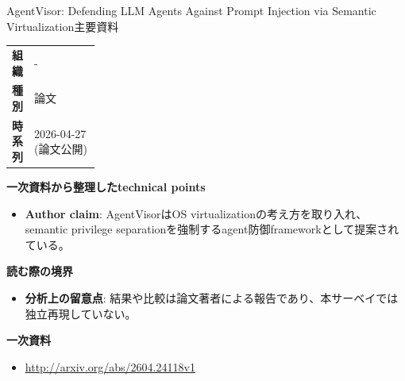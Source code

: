 \begin{technicalnote}{AgentVisor: Defending LLM Agents Against Prompt Injection via Semantic Virtualization}{主要資料}
\begingroup
\begin{tabularx}{\linewidth}{@{}>{\bfseries}p{0.22\linewidth}X@{}}
組織 & - \\
種別 & 論文 \\
時系列 & 2026-04-27 (論文公開) \\
\end{tabularx}
\smallskip
{\bfseries 一次資料から整理したtechnical points}
\begin{itemize}[leftmargin=1.5em,itemsep=0.35em]
\item \textbf{Author claim}: AgentVisorはOS virtualizationの考え方を取り入れ、semantic privilege separationを強制するagent防御frameworkとして提案されている。
\end{itemize}
{\bfseries 読む際の境界}
\begin{itemize}[leftmargin=1.5em,itemsep=0.35em]
\item \textbf{分析上の留意点}: 結果や比較は論文著者による報告であり、本サーベイでは独立再現していない。
\end{itemize}
\begin{samepage}
{\bfseries 一次資料}
\begingroup\sloppy
\begin{itemize}[leftmargin=1.5em,itemsep=0.25em]
\item {\scriptsize\url{http://arxiv.org/abs/2604.24118v1}}
\end{itemize}
\endgroup
\end{samepage}
\endgroup
\end{technicalnote}
\medskip


